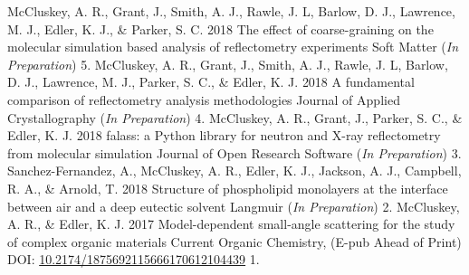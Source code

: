 \begin{cvpubys}
  \cvpuby
    {McCluskey, A. R., Grant, J., Smith, A. J., Rawle, J. L, Barlow, D. J., Lawrence, M. J., Edler, K. J., \& Parker, S. C.}
    {2018}
    {The effect of coarse-graining on the molecular simulation based analysis of reflectometry experiments}
    {Soft Matter (\emph{In Preparation})}
    {5.}
  \cvpuby
	{McCluskey, A. R., Grant, J., Smith, A. J., Rawle, J. L, Barlow, D. J., Lawrence, M. J., Parker, S. C., \& Edler, K. J.}
    {2018}
    {A fundamental comparison of reflectometry analysis methodologies}
    {Journal of Applied Crystallography (\emph{In Preparation})}
    {4.}
  \cvpuby
    {McCluskey, A. R., Grant, J., Parker, S. C., \& Edler, K. J.}
    {2018}
    {falass: a Python library for neutron and X-ray reflectometry from molecular simulation}
    {Journal of Open Research Software (\emph{In Preparation})}
    {3.}
  \cvpuby
    {Sanchez-Fernandez, A., McCluskey, A. R., Edler, K. J., Jackson, A. J., Campbell, R. A., \& Arnold, T.}
    {2018}
    {Structure of phospholipid monolayers at the interface between air and a deep eutectic solvent}
    {Langmuir (\emph{In Preparation})}
    {2.}
  \cvpuby
    {McCluskey, A. R., \& Edler, K. J.}
    {2017}
    {Model-dependent small-angle scattering for the study of complex organic materials}
    {Current Organic Chemistry, (E-pub Ahead of Print) DOI: \href{10.2174/1875692115666170612104439}{10.2174/1875692115666170612104439}}
    {1.}
\end{cvpubys}
